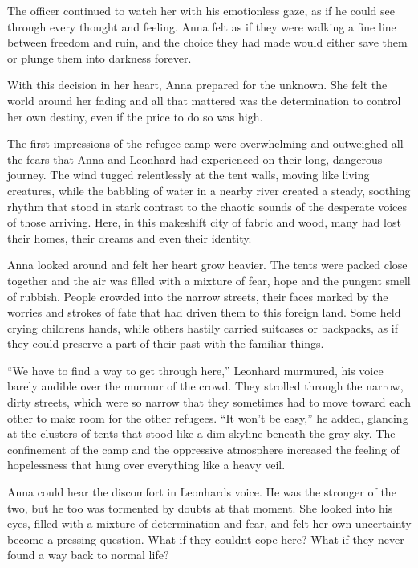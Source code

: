 \documentclass[
]{article}
\begin{document}
The officer continued to watch her with his emotionless gaze, as if he
could see through every thought and feeling. Anna felt as if they were
walking a fine line between freedom and ruin, and the choice they had
made would either save them or plunge them into darkness forever.

With this decision in her heart, Anna prepared for the unknown. She felt
the world around her fading and all that mattered was the determination
to control her own destiny, even if the price to do so was high.

The first impressions of the refugee camp were overwhelming and
outweighed all the fears that Anna and Leonhard had experienced on their
long, dangerous journey. The wind tugged relentlessly at the tent walls,
moving like living creatures, while the babbling of water in a nearby
river created a steady, soothing rhythm that stood in stark contrast to
the chaotic sounds of the desperate voices of those arriving. Here, in
this makeshift city of fabric and wood, many had lost their homes, their
dreams and even their identity.

Anna looked around and felt her heart grow heavier. The tents were
packed close together and the air was filled with a mixture of fear,
hope and the pungent smell of rubbish. People crowded into the narrow
streets, their faces marked by the worries and strokes of fate that had
driven them to this foreign land. Some held crying
children\textquotesingle s hands, while others hastily carried suitcases
or backpacks, as if they could preserve a part of their past with the
familiar things.

``We have to find a way to get through here,'' Leonhard murmured, his
voice barely audible over the murmur of the crowd. They strolled through
the narrow, dirty streets, which were so narrow that they sometimes had
to move toward each other to make room for the other refugees. ``It
won't be easy,'' he added, glancing at the clusters of tents that stood
like a dim skyline beneath the gray sky. The confinement of the camp and
the oppressive atmosphere increased the feeling of hopelessness that
hung over everything like a heavy veil.

Anna could hear the discomfort in Leonhard\textquotesingle s voice. He
was the stronger of the two, but he too was tormented by doubts at that
moment. She looked into his eyes, filled with a mixture of determination
and fear, and felt her own uncertainty become a pressing question. What
if they couldn\textquotesingle t cope here? What if they never found a
way back to normal life?
\end{document}
